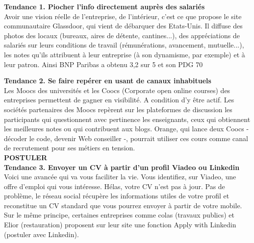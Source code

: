 \documentclass[11pt,twoside,a4paper]{article}
\begin{document}
\textbf{Tendance 1. Piocher l'info directement aupr{\`e}s des salari{\'e}s}~\\

Avoir une vision r{\'e}elle de l'entreprise, de l'int{\'e}rieur, c'est ce que propose le site communautaire Glassdoor, qui vient de d{\'e}barquer des Etats-Unis. Il diffuse des photos des locaux (bureaux, aires de d{\'e}tente, cantines...), des appr{\'e}ciations de salari{\'e}s sur leurs conditions de travail (r{\'e}mun{\'e}rations, avancement, mutuelle...), les notes qu'ils attribuent {\`a} leur entreprise ({\`a} son dynamisme, par exemple) et {\`a} leur patron. Ainsi BNP Paribas a obtenu 3,2 sur 5 et son PDG 70%

\textbf{Tendance 2. Se faire rep{\'e}rer en usant de canaux inhabituels}~\\

Les Moocs des universit{\'e}s et les Coocs (Corporate open online courses) des entreprises permettent de gagner en visibilit{\'e}. A condition d'y {\^e}tre actif. Les soci{\'e}t{\'e}s partenaires des Moocs rep{\`e}rent sur les plateformes de discussion les participants qui questionnent avec pertinence les enseignants, ceux qui obtiennent les meilleures notes ou qui contribuent aux blogs. Orange, qui lance deux Coocs - d{\'e}coder le code, devenir Web conseiller -, pourrait utiliser ces cours comme canal de recrutement pour ses m{\'e}tiers en tension. ~\\

\textbf{\textsc{POSTULER}}~\\

\textbf{Tendance 3. Envoyer un CV {\`a} partir d'un profil Viadeo ou Linkedin}~\\

Voici une avanc{\'e}e qui va vous faciliter la vie. Vous identifiez, sur Viadeo, une offre d'emploi qui vous int{\'e}resse. H{\'e}las, votre CV n'est pas {\`a} jour. Pas de probl{\`e}me, le r{\'e}seau social r{\'e}cup{\`e}re les informations utiles de votre profil et reconstitue un CV standard que vous pourrez envoyer {\`a} partir de votre mobile. Sur le m{\^e}me principe, certaines entreprises comme colas (travaux publics) et Elior (restauration) proposent sur leur site une fonction Apply with Linkedin (postuler avec Linkedin). ~\\
\end{document}
